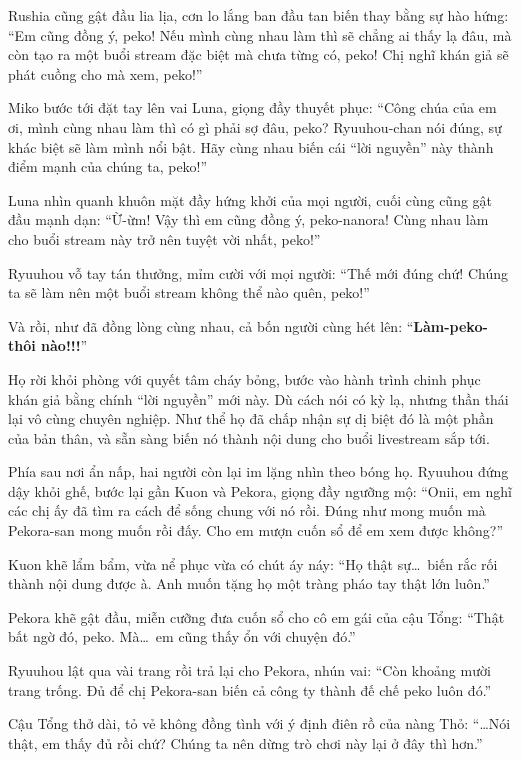 \documentclass[../main.tex]{subfiles}
\begin{document}
Rushia cũng gật đầu lia lịa, cơn lo lắng ban đầu tan biến thay bằng sự hào hứng: ``Em cũng đồng ý, peko! Nếu mình cùng nhau làm thì sẽ chẳng ai thấy lạ đâu, mà còn tạo ra một buổi stream đặc biệt mà chưa từng có, peko! Chị nghĩ khán giả sẽ phát cuồng cho mà xem, peko!''

Miko bước tới đặt tay lên vai Luna, giọng đầy thuyết phục: ``Công chúa của em ơi, mình cùng nhau làm thì có gì phải sợ đâu, peko? Ryuuhou-chan nói đúng, sự khác biệt sẽ làm mình nổi bật. Hãy cùng nhau biến cái ``lời nguyền'' này thành điểm mạnh của chúng ta, peko!''

Luna nhìn quanh khuôn mặt đầy hứng khởi của mọi người, cuối cùng cũng gật đầu mạnh dạn: ``Ừ-ừm! Vậy thì em cũng đồng ý, peko-nanora! Cùng nhau làm cho buổi stream này trở nên tuyệt vời nhất, peko!''

Ryuuhou vỗ tay tán thưởng, mỉm cười với mọi người: ``Thế mới đúng chứ! Chúng ta sẽ làm nên một buổi stream không thể nào quên, peko!''

Và rồi, như đã đồng lòng cùng nhau, cả bốn người cùng hét lên: ``\textbf{Làm-peko-thôi nào!!!}''

Họ rời khỏi phòng với quyết tâm cháy bỏng, bước vào hành trình chinh phục khán giả bằng chính ``lời nguyền'' mới này. Dù cách nói có kỳ lạ, nhưng thần thái lại vô cùng chuyên nghiệp. Như thể họ đã chấp nhận sự dị biệt đó là một phần của bản thân, và sẵn sàng biến nó thành nội dung cho buổi livestream sắp tới.

Phía sau nơi ẩn nấp, hai người còn lại im lặng nhìn theo bóng họ. Ryuuhou đứng dậy khỏi ghế, bước lại gần Kuon và Pekora, giọng đầy ngưỡng mộ: ``Onii, em nghĩ các chị ấy đã tìm ra cách để sống chung với nó rồi. Đúng như mong muốn mà Pekora-san mong muốn rồi đấy. Cho em mượn cuốn sổ để em xem được không?''

Kuon khẽ lẩm bẩm, vừa nể phục vừa có chút áy náy: ``Họ thật sự\dots\ biến rắc rối thành nội dung được à. Anh muốn tặng họ một tràng pháo tay thật lớn luôn.''

Pekora khẽ gật đầu, miễn cưỡng đưa cuốn sổ cho cô em gái của cậu Tổng: ``Thật bất ngờ đó, peko. Mà\dots\ em cũng thấy ổn với chuyện đó.''

Ryuuhou lật qua vài trang rồi trả lại cho Pekora, nhún vai: ``Còn khoảng mười trang trống. Đủ để chị Pekora-san biến cả công ty thành đế chế peko luôn đó.''

Cậu Tổng thở dài, tỏ vẻ không đồng tình với ý định điên rồ của nàng Thỏ: ``\dots Nói thật, em thấy đủ rồi chứ? Chúng ta nên dừng trò chơi này lại ở đây thì hơn.''
\end{document}
